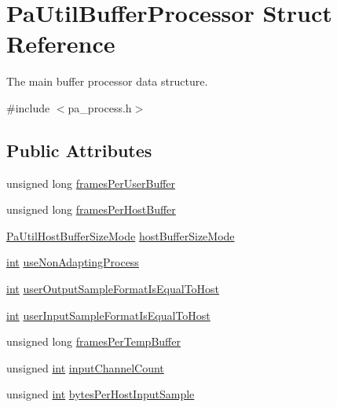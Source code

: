 \hypertarget{struct_pa_util_buffer_processor}{}\section{Pa\+Util\+Buffer\+Processor Struct Reference}
\label{struct_pa_util_buffer_processor}


The main buffer processor data structure.  




{\ttfamily \#include $<$pa\+\_\+process.\+h$>$}

\subsection*{Public Attributes}
\begin{DoxyCompactItemize}
\item 
unsigned long \hyperlink{struct_pa_util_buffer_processor_a2a61168f6d216e6aaade39b77452bcb9}{frames\+Per\+User\+Buffer}
\item 
unsigned long \hyperlink{struct_pa_util_buffer_processor_aeec9ebf0c415b1e8aa4b1667ebbc839a}{frames\+Per\+Host\+Buffer}
\item 
\hyperlink{pa__process_8h_a16c84d8c0ac62944797f530bf852484f}{Pa\+Util\+Host\+Buffer\+Size\+Mode} \hyperlink{struct_pa_util_buffer_processor_a71c934464b2671889ec3e20192e6e8d9}{host\+Buffer\+Size\+Mode}
\item 
\hyperlink{xmltok_8h_a5a0d4a5641ce434f1d23533f2b2e6653}{int} \hyperlink{struct_pa_util_buffer_processor_a58c81d2f3c782274e0ab7ad6ab006034}{use\+Non\+Adapting\+Process}
\item 
\hyperlink{xmltok_8h_a5a0d4a5641ce434f1d23533f2b2e6653}{int} \hyperlink{struct_pa_util_buffer_processor_ad791f8650ed327dc106a6f97c3ec5799}{user\+Output\+Sample\+Format\+Is\+Equal\+To\+Host}
\item 
\hyperlink{xmltok_8h_a5a0d4a5641ce434f1d23533f2b2e6653}{int} \hyperlink{struct_pa_util_buffer_processor_a8667d06325ee28d95c48159ff49e044e}{user\+Input\+Sample\+Format\+Is\+Equal\+To\+Host}
\item 
unsigned long \hyperlink{struct_pa_util_buffer_processor_a583f3db6161dbf7a79fb9b56f7c578a0}{frames\+Per\+Temp\+Buffer}
\item 
unsigned \hyperlink{xmltok_8h_a5a0d4a5641ce434f1d23533f2b2e6653}{int} \hyperlink{struct_pa_util_buffer_processor_a878ec922a2464a3d57119d175f362366}{input\+Channel\+Count}
\item 
unsigned \hyperlink{xmltok_8h_a5a0d4a5641ce434f1d23533f2b2e6653}{int} \hyperlink{struct_pa_util_buffer_processor_ad7d3d4973cfe90f69dbb2fcf16a59d92}{bytes\+Per\+Host\+Input\+Sample}

\end{DoxyCompactItemize}
